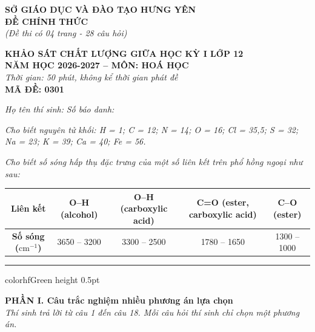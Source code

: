 \documentclass[11pt,a4paper]{article}
\begin{document}
\begin{minipage}[t]{0.48\textwidth}
\textbf{SỞ GIÁO DỤC VÀ ĐÀO TẠO HƯNG YÊN}\\
\textbf{ĐỀ CHÍNH THỨC}\\
\textit{(Đề thi có 04 trang - 28 câu hỏi)}
\end{minipage}
\hfill
\begin{minipage}[t]{0.48\textwidth}
\raggedleft
\textbf{\color{hfRed}KHẢO SÁT CHẤT LƯỢNG GIỮA HỌC KỲ I LỚP 12}\\
\textbf{NĂM HỌC 2026-2027 -- MÔN: HOÁ HỌC}\\
\textit{Thời gian: 50 phút, không kể thời gian phát đề}\\
\textbf{MÃ ĐỀ: 0301}
\end{minipage}

\vspace{4pt}
\noindent
\textit{Họ tên thí sinh:} \dotfill \textit{Số báo danh:} \dotfill

\vspace{3pt}
\noindent
\textit{\footnotesize Cho biết nguyên tử khối: H = 1; C = 12; N = 14; O = 16; Cl = 35,5; S = 32; Na = 23; K = 39; Ca = 40; Fe = 56.}

\vspace{2pt}
\noindent
\textit{\footnotesize Cho biết số sóng hấp thụ đặc trưng của một số liên kết trên phổ hồng ngoại như sau:}
\begin{center}
\renewcommand{\arraystretch}{1.15}
\footnotesize
\begin{tabular}{|c|c|c|c|c|}
\hline
\rowcolor{tableGreen}
\textbf{Liên kết} & \textbf{O--H (alcohol)} & \textbf{O--H (carboxylic acid)} & \textbf{C=O (ester, carboxylic acid)} & \textbf{C--O (ester)} \\
\hline
\textbf{Số sóng ($\text{cm}^{-1}$)} & 3650 -- 3200 & 3300 -- 2500 & 1780 -- 1650 & 1300 -- 1000 \\
\hline
\end{tabular}
\end{center}

\vspace{2pt}
\hrule color{hfGreen} height 0.5pt

\vspace{4pt}
\noindent
{\color{mainGreen}\textbf{\large PHẦN I. Câu trắc nghiệm nhiều phương án lựa chọn}}\\
\textit{\small Thí sinh trả lời từ câu 1 đến câu 18. Mỗi câu hỏi thí sinh chỉ chọn một phương án.}
\vspace{2pt}
\end{document}
